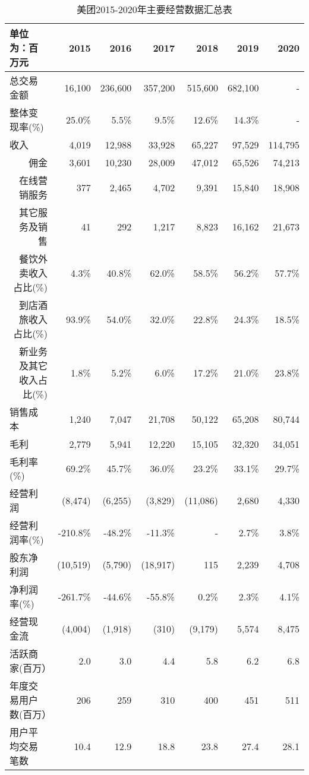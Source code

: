 \documentclass[UTF8,a4paper,12pt,lang=cn,fontset = windows]{elegantpaper} %
\begin{document}
\begin{table}[htbp]
  \centering
  \caption{美团2015-2020年主要经营数据汇总表\label{tab:huizong}}
    \begin{tabular}{lrrrrrr}
      \toprule
    单位为：百万元 & 2015  & 2016  & 2017  & 2018  & 2019  & 2020 \\
    \midrule
    总交易金额 & 16,100  & 236,600  & 357,200  & 515,600  & 682,100  &            -    \\
    整体变现率(\%) & 25.0\%       & 5.5\%       & 9.5\% & 12.6\% & 14.3\% &            -    \\
    收入    & 4,019  & 12,988  & 33,928  & 65,227  & 97,529  & 114,795  \\
    \multicolumn{1}{r}{佣金} & 3,601  & 10,230  & 28,009  & 47,012  & 65,526  & 74,213  \\
    \multicolumn{1}{r}{在线营销服务} & 377   & 2,465  & 4,702  & 9,391  & 15,840  & 18,908  \\
    \multicolumn{1}{r}{其它服务及销售} & 41    & 292   & 1,217  & 8,823  & 16,162  & 21,673  \\
    \multicolumn{1}{r}{餐饮外卖收入占比(\%)} & 4.3\% & 40.8\% & 62.0\% & 58.5\% & 56.2\% & 57.7\% \\
    \multicolumn{1}{r}{到店酒旅收入占比(\%)} & 93.9\% & 54.0\% & 32.0\% & 22.8\% & 24.3\% & 18.5\% \\
    \multicolumn{1}{r}{新业务及其它收入占比(\%)} & 1.8\% & 5.2\% & 6.0\% & 17.2\% & 21.0\% & 23.8\% \\
    销售成本  & 1,240  & 7,047  & 21,708  & 50,122  & 65,208  & 80,744  \\
    毛利    & 2,779  & 5,941  & 12,220  & 15,105  & 32,320  & 34,051  \\
    毛利率(\%) & 69.2\% & 45.7\% & 36.0\% & 23.2\% & 33.1\% & 29.7\% \\
    经营利润  & \textcolor[rgb]{ 1,  0,  0}{(8,474)} & \textcolor[rgb]{ 1,  0,  0}{(6,255)} & \textcolor[rgb]{ 1,  0,  0}{(3,829)} & \textcolor[rgb]{ 1,  0,  0}{(11,086)} & 2,680  & 4,330 \\
    经营利润率(\%) & -210.8\% & -48.2\% & -11.3\% &           -    & 2.7\% & 3.8\% \\
    股东净利润 & \textcolor[rgb]{ 1,  0,  0}{(10,519)} & \textcolor[rgb]{ 1,  0,  0}{(5,790)} & \textcolor[rgb]{ 1,  0,  0}{(18,917)} & 115   & 2,239  & 4,708  \\
    净利润率(\%) & -261.7\% & -44.6\% & -55.8\% & 0.2\% & 2.3\% & 4.1\% \\
    经营现金流 & \textcolor[rgb]{ 1,  0,  0}{(4,004)} & \textcolor[rgb]{ 1,  0,  0}{(1,918)} & \textcolor[rgb]{ 1,  0,  0}{(310)} & \textcolor[rgb]{ 1,  0,  0}{(9,179)} & 5,574  & 8,475  \\
    活跃商家(百万） & 2.0   & 3.0   & 4.4   & 5.8   & 6.2   & 6.8  \\
    年度交易用户数(百万） & 206   & 259   & 310   & 400   & 451   & 511 \\
    用户平均交易笔数 & 10.4  & 12.9  & 18.8  & 23.8  & 27.4  & 28.1 \\
    \bottomrule
    \end{tabular}%
\end{table}%
\end{document}

